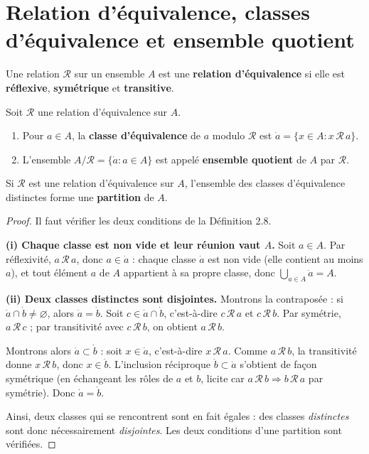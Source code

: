 \documentclass[a4paper,12pt,openany]{book}
\begin{document}
\section{Relation d'équivalence, classes d'équivalence et ensemble quotient}


\begin{definition}
Une relation $\mathcal{R}$ sur un ensemble $A$ est une \textbf{relation
d'équivalence} si elle est \textbf{réflexive}, \textbf{symétrique} et
\textbf{transitive}.
\end{definition}

\begin{definition}
Soit $\mathcal{R}$ une relation d'équivalence sur $A$.
\begin{enumerate}
  \item Pour $a \in A$, la \textbf{classe d'équivalence} de $a$ modulo
  $\mathcal{R}$ est $\dot{a} = \{x \in A : x\,\mathcal{R}\,a\}$.
  \item L'ensemble $A/\mathcal{R} = \{\dot{a} : a \in A\}$ est appelé
  \textbf{ensemble quotient} de $A$ par $\mathcal{R}$.
\end{enumerate}
\end{definition}

\begin{theoreme}
Si $\mathcal{R}$ est une relation d'équivalence sur $A$, l'ensemble des
classes d'équivalence distinctes forme une \textbf{partition} de $A$.
\end{theoreme}

\begin{proof}
Il faut vérifier les deux conditions de la Définition 2.8.

\textbf{(i) Chaque classe est non vide et leur réunion vaut $A$.} Soit $a\in
A$. Par réflexivité, $a\,\mathcal{R}\,a$, donc $a \in \dot a$ : chaque classe
$\dot a$ est non vide (elle contient au moins $a$), et tout élément $a$ de
$A$ appartient à sa propre classe, donc $\bigcup_{a\in A} \dot a = A$.

\textbf{(ii) Deux classes distinctes sont disjointes.} Montrons la
contraposée : si $\dot a \cap \dot b \neq \varnothing$, alors $\dot a =
\dot b$. Soit $c \in \dot a \cap \dot b$, c'est-à-dire $c\,\mathcal{R}\,a$ et
$c\,\mathcal{R}\,b$. Par symétrie, $a\,\mathcal{R}\,c$ ; par transitivité avec
$c\,\mathcal{R}\,b$, on obtient $a\,\mathcal{R}\,b$.

Montrons alors $\dot a \subset \dot b$ : soit $x \in \dot a$, c'est-à-dire
$x\,\mathcal{R}\,a$. Comme $a\,\mathcal{R}\,b$, la transitivité donne
$x\,\mathcal{R}\,b$, donc $x \in \dot b$. L'inclusion réciproque $\dot b
\subset \dot a$ s'obtient de façon symétrique (en échangeant les rôles de $a$
et $b$, licite car $a\,\mathcal{R}\,b \Rightarrow b\,\mathcal{R}\,a$ par
symétrie). Donc $\dot a = \dot b$.

Ainsi, deux classes qui se rencontrent sont en fait égales : des classes
\emph{distinctes} sont donc nécessairement \emph{disjointes}. Les deux
conditions d'une partition sont vérifiées.
\end{proof}
\end{document}
